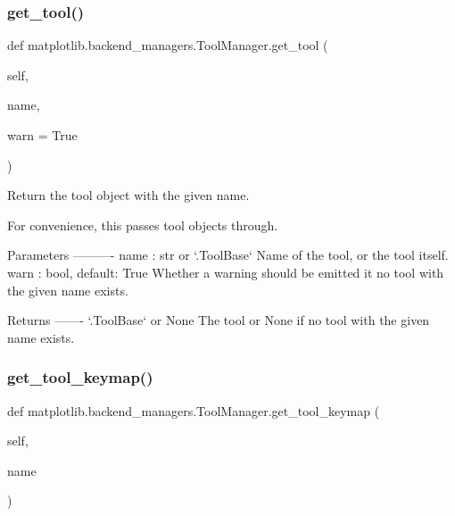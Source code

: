 \mbox{\label{classmatplotlib_1_1backend__managers_1_1ToolManager_ae5ddb2307368e7c3bbb10bc447104b2c}} 
\subsubsection{\texorpdfstring{get\+\_\+tool()}{get\_tool()}}
{\footnotesize\ttfamily def matplotlib.\+backend\+\_\+managers.\+Tool\+Manager.\+get\+\_\+tool (\begin{DoxyParamCaption}\item[{}]{self,  }\item[{}]{name,  }\item[{}]{warn = {\ttfamily True} }\end{DoxyParamCaption})}

\begin{DoxyVerb}Return the tool object with the given name.

For convenience, this passes tool objects through.

Parameters
----------
name : str or `.ToolBase`
    Name of the tool, or the tool itself.
warn : bool, default: True
    Whether a warning should be emitted it no tool with the given name
    exists.

Returns
-------
`.ToolBase` or None
    The tool or None if no tool with the given name exists.
\end{DoxyVerb}
 \mbox{\label{classmatplotlib_1_1backend__managers_1_1ToolManager_a18680c9b74a62aae5569481a0bc6f00e}} 
\subsubsection{\texorpdfstring{get\+\_\+tool\+\_\+keymap()}{get\_tool\_keymap()}}
{\footnotesize\ttfamily def matplotlib.\+backend\+\_\+managers.\+Tool\+Manager.\+get\+\_\+tool\+\_\+keymap (\begin{DoxyParamCaption}\item[{}]{self,  }\item[{}]{name }\end{DoxyParamCaption})}

